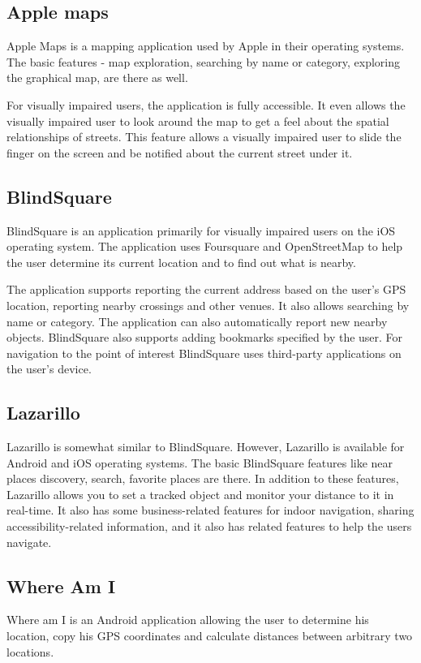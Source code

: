 \documentclass[nolof,digital]{fithesis3}
\begin{document}
\subsection{Apple maps}
Apple Maps \parencite{applemaps} is a mapping application used by Apple in their operating systems. The basic features - map exploration, searching by name or category, exploring the graphical map, are there as well.

For visually impaired users, the application is fully accessible. It even allows the visually impaired user to look around the map to get a feel about the spatial relationships of streets. This feature allows a visually impaired user to slide the finger on the screen and be notified about the current street under it.
\subsection{BlindSquare}
BlindSquare \parencite{blindsquare} is an application primarily for visually impaired users on the iOS operating system. The application uses Foursquare and OpenStreetMap to help the user determine its current location and to find out what is nearby.

The application supports reporting the current address based on the user's GPS location, reporting nearby crossings and other venues. It also allows searching by name or category. The application can also automatically report new nearby objects. BlindSquare also supports adding bookmarks specified by the user. For navigation to the point of interest BlindSquare uses third-party applications on the user's device.
\subsection{Lazarillo}
Lazarillo \parencite{lazarillo} is somewhat similar to BlindSquare. However, Lazarillo is available for Android and iOS operating systems. The basic BlindSquare features like near places discovery, search, favorite places are there. In addition to these features, Lazarillo allows you to set a tracked object and monitor your distance to it in real-time. It also has some business-related features for indoor navigation, sharing accessibility-related information, and it also has related features to help the users navigate.
\subsection{Where Am I}
Where am I \parencite{whereami} is an Android application allowing the user to determine his location, copy his GPS coordinates and calculate distances between arbitrary two locations.
\end{document}
